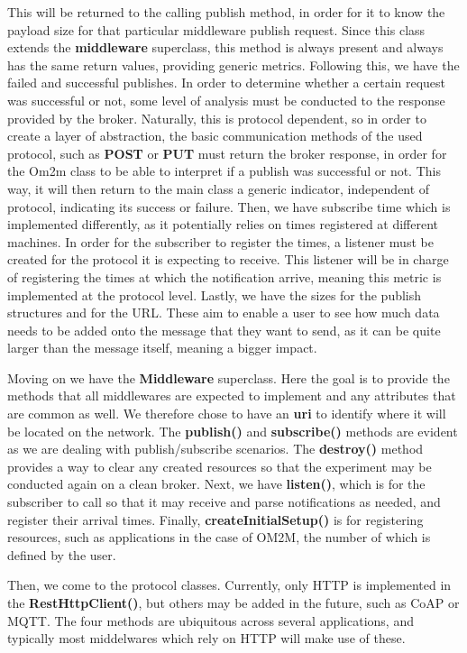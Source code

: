 \documentclass[conference]{IEEEtran}
\begin{document}
This will be returned to the calling publish method, in order for it to know the payload size for that particular middleware publish request. Since this class extends the \textbf{middleware} superclass, this method is always present and always has the same return values, providing generic metrics.
Following this, we have the failed and successful publishes. In order to determine whether a certain request was successful or not, some level of analysis must be conducted to the response provided by the broker. Naturally, this is protocol dependent, so in order to create a layer of abstraction, the basic communication methods of the used protocol, such as \textbf{POST} or \textbf{PUT} must return the broker response, in order for the Om2m class to be able to interpret if a publish was successful or not. This way, it will then return to the main class a generic indicator, independent of protocol, indicating its success or failure. 
Then, we have subscribe time which is implemented differently, as it potentially relies on times registered at different machines. In order for the subscriber to register the times, a listener must be created for the protocol it is expecting to receive. This listener will be in charge of registering the times at which the notification arrive, meaning this metric is implemented at the protocol level. Lastly, we have the sizes for the publish structures and for the URL\@. These aim to enable a user to see how much data needs to be added onto the message that they want to send, as it can be quite larger than the message itself, meaning a bigger impact.

Moving on we have the \textbf{Middleware} superclass. Here the goal is to provide the methods that all middlewares are expected to implement and any attributes that are common as well. We therefore chose to have an \textbf{uri} to identify where it will be located on the network. The \textbf{publish()} and \textbf{subscribe()} methods are evident as we are dealing with publish/subscribe scenarios. The \textbf{destroy()} method provides a way to clear any created resources so that the experiment may be conducted again on a clean broker. Next, we have \textbf{listen()}, which is for the subscriber to call so that it may receive and parse notifications as needed, and register their arrival times. Finally, \textbf{createInitialSetup()} is for registering resources, such as applications in the case of OM2M, the number of which is defined by the user.

Then, we come to the protocol classes. Currently, only HTTP is implemented in the \textbf{RestHttpClient()}, but others may be added in the future, such as CoAP or MQTT\@. The four methods are ubiquitous across several applications, and typically most middelwares which rely on HTTP will make use of these. 
\end{document}
